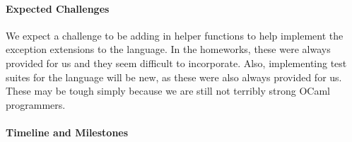 \documentclass{article}
\begin{document}
\paragraph{Expected Challenges}
We expect a challenge to be adding in helper functions to help implement the exception extensions to the language. In the homeworks, these were always provided for us and they seem difficult to incorporate. Also, implementing test suites for the language will be new, as these were also always provided for us. These may be tough simply because we are still not terribly strong OCaml programmers.

\paragraph{Timeline and Milestones}
\end{document}
